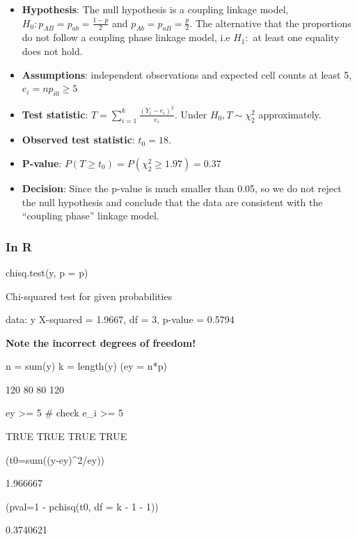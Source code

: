 \documentclass[a4paper]{article}
\begin{document}
\begin{itemize}
	\item \textbf{Hypothesis}: The null hypothesis is a coupling linkage model,\( H_0 : p_{AB} = p_{ab} = \frac{1-p}{2} \) and \( p_{Ab} = p_{aB} = \frac{p}{2} \). The alternative that the proportions do not follow a coupling phase linkage model, i.e \( H_1: \) at least one equality does not hold.
	\item \textbf{Assumptions}: independent observations and expected cell counts at least 5, \( e_i = np_{i0} \geq 5 \)
	\item \textbf{Test statistic}: \( T = \sum\limits_{i=1}^{k} \frac{(Y_i - e_i)^2}{e_i} \). Under \( H_0, T \sim \chi^2_2 \) approximately.
	\item \textbf{Observed test statistic}: \( t_0 = 18 \).
	\item \textbf{P-value}: \( P(T\geq t_0) = P(\chi^2_2 \geq 1.97) =  0.37 \)
	\item \textbf{Decision}: Since the p-value is much smaller than 0.05,  so we do not reject the null hypothesis and conclude that the data are consistent with the ``coupling phase'' linkage model.
\end{itemize}
\subsubsection{In R}
\begin{Schunk}
\begin{Sinput}
chisq.test(y, p = p)
\end{Sinput}
\begin{Soutput}

	Chi-squared test for given probabilities

data:  y
X-squared = 1.9667, df = 3, p-value = 0.5794
\end{Soutput}
\end{Schunk}
\begin{tcolorbox}[bluestylecolor]
	\textbf{Note the incorrect degrees of freedom!}
\end{tcolorbox}
\begin{Schunk}
\begin{Sinput}
n = sum(y)
k = length(y)
(ey = n*p)
\end{Sinput}
\begin{Soutput}
[1] 120  80  80 120
\end{Soutput}
\begin{Sinput}
ey >= 5 # check e_i >= 5
\end{Sinput}
\begin{Soutput}
[1] TRUE TRUE TRUE TRUE
\end{Soutput}
\begin{Sinput}
(t0=sum((y-ey)^2/ey))
\end{Sinput}
\begin{Soutput}
[1] 1.966667
\end{Soutput}
\begin{Sinput}
(pval=1 - pchisq(t0, df = k - 1 - 1))
\end{Sinput}
\begin{Soutput}
[1] 0.3740621
\end{Soutput}
\end{Schunk}
\end{document}

